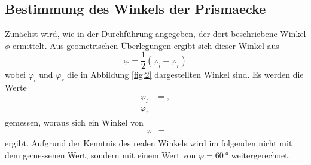 
\subsection{Bestimmung des Winkels der Prismaecke}
Zunächst wird, wie in der Durchführung angegeben, der dort beschriebene Winkel $\phi$ ermittelt.
Aus geometrischen Überlegungen ergibt sich dieser Winkel aus
\begin{equation}
  \varphi = \frac{1}{2} ( \varphi_l - \varphi_r)
\end{equation}
wobei $\varphi_l$ und $\varphi_r$ die in Abbildung \ref{fig:2} dargestellten Winkel sind.
Es werden die Werte
\begin{align*}
  \varphi_l &= ,\\
  \varphi_r &= 
\end{align*}
gemessen, woraus sich ein Winkel von
\begin{align*}
  \varphi &= 
\end{align*}
ergibt.
Aufgrund der Kenntnis des realen Winkels wird im folgenden nicht mit dem gemessenen Wert, sondern mit einem Wert von $\varphi = \SI{60}{\degree}$ weitergerechnet.


